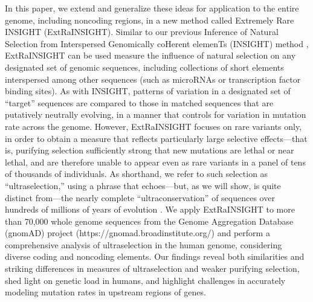 \documentclass[11pt]{article}
\begin{document}
In this paper, we extend and generalize these ideas for application to the entire genome, including noncoding regions, in a new method called Extremely Rare INSIGHT (ExtRaINSIGHT).  Similar to our previous Inference of Natural Selection from Interspersed Genomically coHerent elemenTs (INSIGHT) method \cite{GRONETAL13,ARBIETAL13}, ExtRaINSIGHT can be used measure the influence of natural selection on any designated set of genomic sequences, including collections of short elements interspersed among other sequences (such as microRNAs or transcription factor binding sites).  As with INSIGHT, patterns of variation in a designated set of ``target'' sequences are compared to those in matched sequences that are putatively neutrally evolving, in a manner that controls for variation in mutation rate across the genome.  However, ExtRaINSIGHT focuses on rare variants only, in order to obtain a measure that reflects particularly large selective effects---that is, purifying selection sufficiently strong that new mutations are lethal or near lethal, and are therefore unable to appear even as rare variants in a panel of tens of thousands of individuals.  As shorthand, we refer to such selection as ``ultraselection,'' using a phrase that echoes---but, as we will show, is quite distinct from---the nearly complete ``ultraconservation'' of sequences over hundreds of millions of years of evolution \cite{BEJEETAL04}.
We apply ExtRaINSIGHT to more than 70,000 whole genome sequences from the Genome Aggregation Database (gnomAD) project (https://gnomad.broadinstitute.org/) \cite{KARCETAL20} and perform a comprehensive analysis of ultraselection in the human genome, considering diverse coding and noncoding elements.  Our findings reveal both similarities and striking differences in measures of ultraselection and weaker purifying selection, shed light on genetic load in humans, and highlight challenges in accurately modeling mutation rates in upstream regions of genes.


\end{document}
